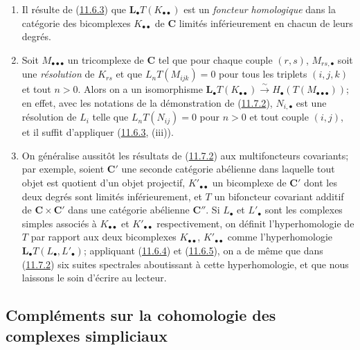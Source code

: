 \begin{remarks}[11.7.3]
\label{0.11.7.3-fr}
\upshape
\begin{enumerate}
\item[{\rm(i)}] Il résulte de (\hyperref[0.11.6.3-fr]{11.6.3}) que
$\mathbf{L}_\bullet T(K_{\bullet\bullet})$ est un \emph{foncteur homologique} dans la
catégorie des bicomplexes $K_{\bullet\bullet}$ de $\boldsymbol{C}$ limités
inférieurement en chacun de leurs degrés.
\item[{\rm(ii)}] Soit $M_{\bullet\bullet\bullet}$ un tricomplexe de
$\boldsymbol{C}$ tel que pour chaque couple $(r,s)$,
$M_{rs,\bullet}$ soit une \emph{résolution} de $K_{rs}$ et que
$L_nT(M_{ijk})=0$ pour tous les triplets $(i,j,k)$ et tout $n>0$. Alors on a
un isomorphisme
$
\mathbf{L}_\bullet T(K_{\bullet\bullet})
\xrightarrow{\sim} H_\bullet(T(M_{\bullet\bullet\bullet}))$;
en effet, avec les notations de la démonstration de
(\hyperref[0.11.7.2-fr]{11.7.2}), $N_{i,\bullet}$ est une résolution de
$L_i$ telle que $L_nT(N_{ij})=0$ pour $n>0$ et tout couple $(i,j)$, et il
suffit d'appliquer (\hyperref[0.11.6.3-fr]{11.6.3}, (iii)).
\item[{\rm(iii)}] On généralise aussitôt les résultats de
(\hyperref[0.11.7.2-fr]{11.7.2}) aux multifoncteurs covariants; par exemple,
soient $\boldsymbol{C}'$ une seconde catégorie abélienne dans laquelle tout objet
est quotient d'un objet projectif, $K'_{\bullet\bullet}$ un bicomplexe de
$\boldsymbol{C}'$ dont les deux degrés sont limités inférieurement, et $T$ un
bifoncteur covariant additif de $\boldsymbol{C}\times\boldsymbol{C}'$ dans une
catégorie abélienne $\boldsymbol{C}''$. Si $L_\bullet$ et $L'_\bullet$ sont les
complexes simples associés à $K_{\bullet\bullet}$ et
$K'_{\bullet\bullet}$ respectivement, on définit l'hyperhomologie de $T$ par
rapport aux deux bicomplexes $K_{\bullet\bullet}$,
$K'_{\bullet\bullet}$ comme l'hyperhomologie
$\mathbf{L}_\bullet T(L_\bullet,L'_\bullet)$; appliquant
(\hyperref[0.11.6.4-fr]{11.6.4}) et
(\hyperref[0.11.6.5-fr]{11.6.5}), on a de même que dans
(\hyperref[0.11.7.2-fr]{11.7.2}) six suites spectrales aboutissant à cette
hyperhomologie, et que nous laissons le soin d'écrire au lecteur.
\end{enumerate}
\end{remarks}

\subsection{Compléments sur la cohomologie des complexes simpliciaux}
\label{subsection:0.11.8-fr}

